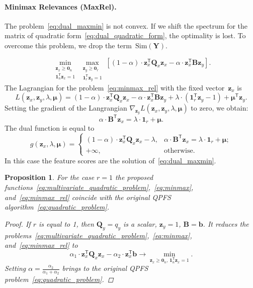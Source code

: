 \documentclass[12pt,twoside]{article}
\newtheorem{proposition}{Proposition}
\theoremstyle{definition}
\newcommand{\bz}{\mathbf{z}}
\newcommand{\bb}{\mathbf{b}}
\newcommand{\bY}{\mathbf{Y}}
\newcommand{\bB}{\mathbf{B}}
\newcommand{\bQ}{\mathbf{Q}}
\newcommand{\T}{\mathsf{T}}
\newcommand{\bmu}{\boldsymbol{\mu}}
\newcommand{\bOne}{\boldsymbol{1}}
\newcommand{\bZero}{\boldsymbol{0}}
\begin{document}
\paragraph{Minimax Relevances (MaxRel).}

The problem~\eqref{eq:dual_maxmin} is not convex. If we shift the spectrum for the matrix of quadratic form~\eqref{eq:dual_quadratic_form}, the optimality is lost. To overcome this problem, we drop the term~$\text{Sim}(\bY)$.

\begin{equation}
\min_{\substack{\bz_x \geq \bZero_n \\ \bOne_n^{\T}\bz_x=1}} 	\max_{\substack{\bz_y \geq \bZero_r \\ \bOne_r^{\T}\bz_y=1}} \left[ (1 - \alpha) \cdot \bz_x^{\T} \bQ_x \bz_x - \alpha \cdot \bz_x^{\T} \bB \bz_y \right].
\label{eq:minmax_rel}
\end{equation}
The Lagrangian for the problem~\eqref{eq:minmax_rel} with the fixed vector~$\bz_x$ is
\[
L(\bz_x, \bz_y, \lambda, \bmu) = (1 - \alpha) \cdot \bz_x^{\T} \bQ_x \bz_x - \alpha \cdot \bz_x^{\T} \bB \bz_y + \lambda \cdot  (\bOne_r^{\T} \bz_y - 1) + \bmu^{\T} \bz_y.
\]
Setting the gradient of the Langrangian $\nabla_{\bz_y} L(\bz_x, \bz_y, \lambda, \bmu)$ to zero, we obtain:
\begin{equation*}
\alpha \cdot \bB^{\T} \bz_x = \lambda \cdot \bOne_r + \bmu.
\end{equation*}
The dual function is equal to
\begin{equation}
g(\bz_x, \lambda, \bmu) =
\begin{cases}
(1 - \alpha) \cdot \bz_x^{\T} \bQ_x \bz_x - \lambda, & \alpha \cdot \bB^{\T} \bz_x = \lambda \cdot \bOne_r + \bmu;  \\
+ \infty, & \text{otherwise}.
\end{cases}
\end{equation}
In this case the feature scores are the solution of~\eqref{eq:dual_maxmin}.

\begin{proposition}
	For the case $r=1$ the proposed functions~\eqref{eq:multivariate_quadratic_problem},~\eqref{eq:minmax}, and~\eqref{eq:minmax_rel} coincide with the original QPFS algorithm~\eqref{eq:quadratic_problem}.

	\begin{proof}
		If $r$ is equal to 1, then $\bQ_y = q_y$ is a scalar, $\bz_y = 1$, $\bB = \bb$. It reduces the problems~\eqref{eq:multivariate_quadratic_problem},~\eqref{eq:minmax}, and~\eqref{eq:minmax_rel} to
		\[
		\alpha_1 \cdot \bz_x^{\T} \bQ_x \bz_x - \alpha_2 \cdot \bz_x^{\T} \bb \rightarrow \min_{\bz_x \geq \bZero_n, \, \bOne_n^{\T}\bz_x=1} .
		\]
		Setting $\alpha = \frac{\alpha_2}{\alpha_1 + \alpha_2}$ brings to the original QPFS problem~\eqref{eq:quadratic_problem}.
	\end{proof}
\end{proposition}
\end{document}
